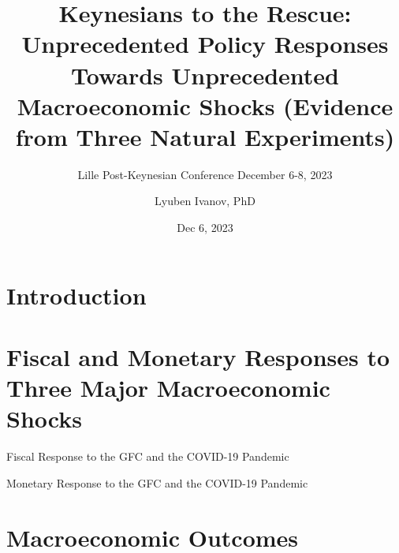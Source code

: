 

\title{Keynesians to the Rescue: Unprecedented Policy Responses Towards Unprecedented Macroeconomic Shocks (Evidence from Three Natural Experiments)}
\subtitle{Lille Post-Keynesian Conference 
\newline December 6-8, 2023 }
\date{Dec 6, 2023}
\author{Lyuben Ivanov, PhD}



\maketitle

\section{Introduction}

\section{Fiscal and Monetary Responses to Three Major Macroeconomic Shocks}

\begin{frame}{Fiscal Response to the GFC and the COVID-19 Pandemic}

\begin{figure}[h!]
     \centering
     
\end{figure} 
	
\end{frame}

\begin{frame}{Monetary Response to the GFC and the COVID-19 Pandemic}

\begin{figure}[h!]
     \centering
     
\end{figure} 
	
\end{frame}


\section{Macroeconomic Outcomes}


